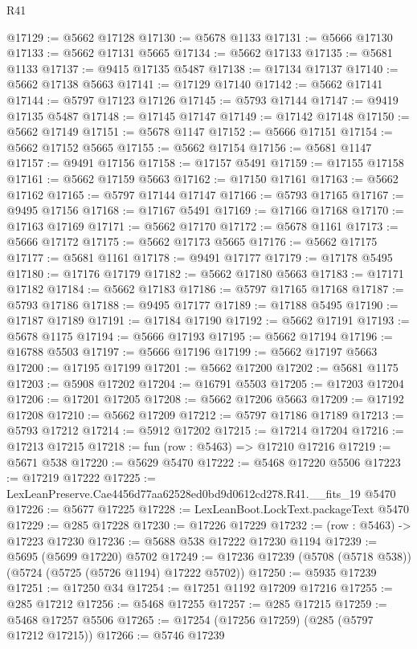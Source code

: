 \begin{lexlean}{R41}
\begin{coremodule}
@17129 := @5662 @17128
@17130 := @5678 @1133
@17131 := @5666 @17130
@17133 := @5662 @17131 @5665
@17134 := @5662 @17133
@17135 := @5681 @1133
@17137 := @9415 @17135 @5487
@17138 := @17134 @17137
@17140 := @5662 @17138 @5663
@17141 := @17129 @17140
@17142 := @5662 @17141
@17144 := @5797 @17123 @17126
@17145 := @5793 @17144
@17147 := @9419 @17135 @5487
@17148 := @17145 @17147
@17149 := @17142 @17148
@17150 := @5662 @17149
@17151 := @5678 @1147
@17152 := @5666 @17151
@17154 := @5662 @17152 @5665
@17155 := @5662 @17154
@17156 := @5681 @1147
@17157 := @9491 @17156
@17158 := @17157 @5491
@17159 := @17155 @17158
@17161 := @5662 @17159 @5663
@17162 := @17150 @17161
@17163 := @5662 @17162
@17165 := @5797 @17144 @17147
@17166 := @5793 @17165
@17167 := @9495 @17156
@17168 := @17167 @5491
@17169 := @17166 @17168
@17170 := @17163 @17169
@17171 := @5662 @17170
@17172 := @5678 @1161
@17173 := @5666 @17172
@17175 := @5662 @17173 @5665
@17176 := @5662 @17175
@17177 := @5681 @1161
@17178 := @9491 @17177
@17179 := @17178 @5495
@17180 := @17176 @17179
@17182 := @5662 @17180 @5663
@17183 := @17171 @17182
@17184 := @5662 @17183
@17186 := @5797 @17165 @17168
@17187 := @5793 @17186
@17188 := @9495 @17177
@17189 := @17188 @5495
@17190 := @17187 @17189
@17191 := @17184 @17190
@17192 := @5662 @17191
@17193 := @5678 @1175
@17194 := @5666 @17193
@17195 := @5662 @17194
@17196 := @16788 @5503
@17197 := @5666 @17196
@17199 := @5662 @17197 @5663
@17200 := @17195 @17199
@17201 := @5662 @17200
@17202 := @5681 @1175
@17203 := @5908 @17202
@17204 := @16791 @5503
@17205 := @17203 @17204
@17206 := @17201 @17205
@17208 := @5662 @17206 @5663
@17209 := @17192 @17208
@17210 := @5662 @17209
@17212 := @5797 @17186 @17189
@17213 := @5793 @17212
@17214 := @5912 @17202
@17215 := @17214 @17204
@17216 := @17213 @17215
@17218 := fun (row : @5463) => @17210 @17216
@17219 := @5671 @538
@17220 := @5629 @5470
@17222 := @5468 @17220 @5506
@17223 := @17219 @17222
@17225 := LexLeanPreserve.Cae4456d77aa62528ed0bd9d0612cd278.R41.__fits_19 @5470
@17226 := @5677 @17225
@17228 := LexLeanBoot.LockText.packageText @5470
@17229 := @285 @17228
@17230 := @17226 @17229
@17232 := (row : @5463) -> @17223 @17230
@17236 := @5688 @538 @17222 @17230 @1194
@17239 := @5695 (@5699 @17220) @5702
@17249 := @17236 @17239 (@5708 (@5718 @538)) (@5724 (@5725 (@5726 @1194) @17222 @5702))
@17250 := @5935 @17239
@17251 := @17250 @34
@17254 := @17251 @1192 @17209 @17216
@17255 := @285 @17212
@17256 := @5468 @17255
@17257 := @285 @17215
@17259 := @5468 @17257 @5506
@17265 := @17254 (@17256 @17259) (@285 (@5797 @17212 @17215))
@17266 := @5746 @17239

\end{coremodule}
\end{lexlean}
